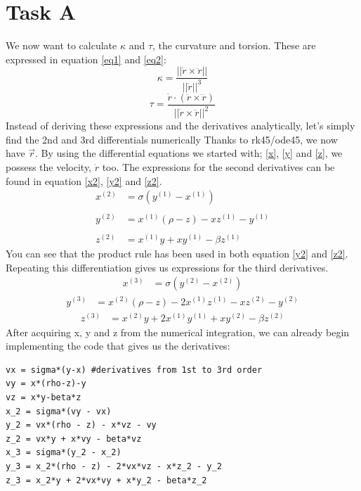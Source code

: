 \documentclass[a4paper,10pt]{article}
\begin{document}
\section*{Task A}
We now want to calculate $\kappa$ and  $\tau$, the curvature and torsion.
These are expressed in equation \ref{eq1} and \ref{eq2}:
\begin{equation}\label{eq1}
 \kappa = \frac{||\dot{r} \times \ddot r||}{||\dot r||^3}
\end{equation}
\begin{equation}\label{eq2}
 \tau = \frac{\dot{r} \cdot (\ddot r \times \dddot r)}{||\dot{r} \times \ddot r||^2}
\end{equation}
Instead of deriving these expressions and the derivatives analytically, let's simply find the 2nd and 3rd differentials numerically
Thanks to rk45/ode45, we now have $\vec r$. By using the differential equations we started with; \ref{x}, \ref{y} and \ref{z}, we possess the velocity, $\dot r$ too.
The expressions for the second derivatives can be found in equation \ref{x2}, \ref{y2} and \ref{z2}. 
\begin{align}
x^{(2)} &= \sigma(y^{(1)} - x^{(1)}) \label{x2}\\
         &\nonumber \\
 y^{(2)} &= x^{(1)}(\rho - z) - xz^{(1)} - y^{(1)} \label{y2} \\
         &\nonumber \\
 z^{(2)} &= x^{(1)}y + xy^{(1)} - \beta z^{(1)} \label{z2} 
\end{align}
You can see that the product rule has been used in both equation \ref{y2} and \ref{z2}. Repeating this differentiation gives us expressions for the third derivatives.
\begin{align}
x^{(3)} &= \sigma(y^{(2)} - x^{(2)}) \label{x3} 
\end{align}
\begin{align}
y^{(3)} &= x^{(2)}(\rho - z) - 2x^{(1)}z^{(1)} - xz^{(2)} - y^{(2)}
\end{align}
\begin{align}
z^{(3)} &= x^{(2)}y + 2x^{(1)}y^{(1)} + xy^{(2)} - \beta z^{(2)}
\end{align}
After acquiring x, y and z from the numerical integration, we can already begin implementing the code that gives us the derivatives:
\begin{lstlisting}
vx = sigma*(y-x) #derivatives from 1st to 3rd order
vy = x*(rho-z)-y
vz = x*y-beta*z
x_2 = sigma*(vy - vx) 
y_2 = vx*(rho - z) - x*vz - vy
z_2 = vx*y + x*vy - beta*vz
x_3 = sigma*(y_2 - x_2)
y_3 = x_2*(rho - z) - 2*vx*vz - x*z_2 - y_2
z_3 = x_2*y + 2*vx*vy + x*y_2 - beta*z_2

\end{lstlisting}
\end{document}
